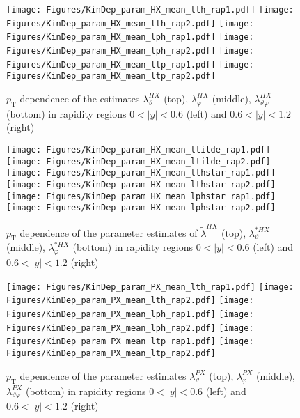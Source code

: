 \documentclass[12pt]{article}
\newcommand{\pT}{p_\mathrm{T}}
\newcommand{\absy}{\left |  y \right |}
\newcommand{\lamthHX}{\lambda^{\scriptscriptstyle HX}_\vartheta}
\newcommand{\lamphHX}{\lambda^{\scriptscriptstyle HX}_\varphi}
\newcommand{\lamthphHX}{\lambda^{\scriptscriptstyle HX}_{\vartheta \varphi}}
\newcommand{\lamtildeHX}{\tilde{\lambda}^{\scriptscriptstyle HX}}
\newcommand{\lamthstarHX}{\lambda^{* \scriptscriptstyle HX}_\vartheta}
\newcommand{\lamphstarHX}{\lambda^{* \scriptscriptstyle HX}_\varphi}
\newcommand{\lamthPX}{\lambda^{\scriptscriptstyle PX}_\vartheta}
\newcommand{\lamphPX}{\lambda^{\scriptscriptstyle PX}_\varphi}
\newcommand{\lamthphPX}{\lambda^{\scriptscriptstyle PX}_{\vartheta \varphi}}
\begin{document}



\begin{figure}[htbp]
\centering
\texttt{[image: Figures/KinDep\_param\_HX\_mean\_lth\_rap1.pdf]}
\texttt{[image: Figures/KinDep\_param\_HX\_mean\_lth\_rap2.pdf]}
\texttt{[image: Figures/KinDep\_param\_HX\_mean\_lph\_rap1.pdf]}
\texttt{[image: Figures/KinDep\_param\_HX\_mean\_lph\_rap2.pdf]}
\texttt{[image: Figures/KinDep\_param\_HX\_mean\_ltp\_rap1.pdf]}
\texttt{[image: Figures/KinDep\_param\_HX\_mean\_ltp\_rap2.pdf]}
\caption{$\pT$ dependence of the estimates $\lamthHX$ (top), $\lamphHX$ (middle), $\lamthphHX$ (bottom) in rapidity regions $0<\absy<0.6$ (left) and $0.6<\absy<1.2$ (right)}
\end{figure}
\clearpage

\begin{figure}[htbp]
\centering
\texttt{[image: Figures/KinDep\_param\_HX\_mean\_ltilde\_rap1.pdf]}
\texttt{[image: Figures/KinDep\_param\_HX\_mean\_ltilde\_rap2.pdf]}
\texttt{[image: Figures/KinDep\_param\_HX\_mean\_lthstar\_rap1.pdf]}
\texttt{[image: Figures/KinDep\_param\_HX\_mean\_lthstar\_rap2.pdf]}
\texttt{[image: Figures/KinDep\_param\_HX\_mean\_lphstar\_rap1.pdf]}
\texttt{[image: Figures/KinDep\_param\_HX\_mean\_lphstar\_rap2.pdf]}
\caption{$\pT$ dependence of the parameter estimates of $\lamtildeHX$ (top),
$\lamthstarHX$ (middle), $\lamphstarHX$ (bottom) in rapidity regions $0<\absy<0.6$ (left) and $0.6<\absy<1.2$ (right)}
\end{figure}
\clearpage









\begin{figure}[htbp]
\centering
\texttt{[image: Figures/KinDep\_param\_PX\_mean\_lth\_rap1.pdf]}
\texttt{[image: Figures/KinDep\_param\_PX\_mean\_lth\_rap2.pdf]}
\texttt{[image: Figures/KinDep\_param\_PX\_mean\_lph\_rap1.pdf]}
\texttt{[image: Figures/KinDep\_param\_PX\_mean\_lph\_rap2.pdf]}
\texttt{[image: Figures/KinDep\_param\_PX\_mean\_ltp\_rap1.pdf]}
\texttt{[image: Figures/KinDep\_param\_PX\_mean\_ltp\_rap2.pdf]}
\caption{$\pT$ dependence of the parameter estimates $\lamthPX$ (top), $\lamphPX$ (middle), $\lamthphPX$ (bottom) in rapidity regions $0<\absy<0.6$ (left) and $0.6<\absy<1.2$ (right)}
\end{figure}
\clearpage
\end{document}
